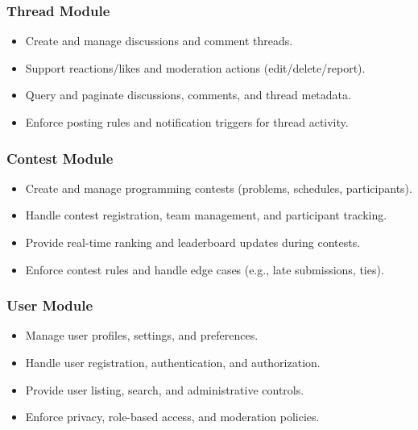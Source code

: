 \subsubsection{Thread Module}
\begin{itemize}
    \item Create and manage discussions and comment threads.
    \item Support reactions/likes and moderation actions (edit/delete/report).
    \item Query and paginate discussions, comments, and thread metadata.
    \item Enforce posting rules and notification triggers for thread activity.
\end{itemize}

\subsubsection{Contest Module}
\begin{itemize}
    \item Create and manage programming contests (problems, schedules, participants).
    \item Handle contest registration, team management, and participant tracking.
    \item Provide real-time ranking and leaderboard updates during contests.
    \item Enforce contest rules and handle edge cases (e.g., late submissions, ties).
\end{itemize}

\subsubsection{User Module}
\begin{itemize}
    \item Manage user profiles, settings, and preferences.
    \item Handle user registration, authentication, and authorization.
    \item Provide user listing, search, and administrative controls.
    \item Enforce privacy, role-based access, and moderation policies.
\end{itemize}

\break